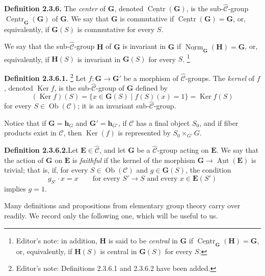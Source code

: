 \medskip
\noindent\textbf{Definition 2.3.6.}
The \emph{center} of \(\mathbf G\), denoted
\(\underline{\operatorname{Centr}}(\mathbf G)\), is the
sub-\(\widehat{\mathscr C}\)-group
\(\underline{\operatorname{Centr}}_{\mathbf G}(\mathbf G)\) of
\(\mathbf G\). We say that \(\mathbf G\) is commutative if
\(\underline{\operatorname{Centr}}(\mathbf G)=\mathbf G\), or,
equivalently, if \(\mathbf G(S)\) is commutative for every \(S\).

We say that the sub-\(\widehat{\mathscr C}\)-group \(\mathbf H\) of
\(\mathbf G\) is invariant in \(\mathbf G\) if
\(\underline{\operatorname{Norm}}_{\mathbf G}(\mathbf H)=\mathbf G\),
or, equivalently, if \(\mathbf H(S)\) is invariant in \(\mathbf G(S)\)
for every \(S\).
\footnote{Editor's note: in addition, \(\mathbf H\) is said to be
\emph{central} in \(\mathbf G\) if
\(\underline{\operatorname{Centr}}_{\mathbf G}(\mathbf H)=\mathbf G\),
or, equivalently, if \(\mathbf H(S)\) is central in \(\mathbf G(S)\)
for every \(S\).}

\medskip
\noindent\textbf{Definition 2.3.6.1.}
\footnote{Editor's note: Definitions 2.3.6.1 and 2.3.6.2 have been
added.}
Let \(f:\mathbf G\to\mathbf G'\) be a morphism of
\(\widehat{\mathscr C}\)-groups. The \emph{kernel} of \(f\), denoted
\(\operatorname{Ker}f\), is the sub-\(\widehat{\mathscr C}\)-group of
\(\mathbf G\) defined by
\[
  (\operatorname{Ker}f)(S)
    =\{x\in\mathbf G(S)\mid f(S)(x)=1\}
    =\operatorname{Ker}f(S)
\]
for every \(S\in\operatorname{Ob}(\mathscr C)\); it is an invariant
sub-\(\widehat{\mathscr C}\)-group.

Notice that if \(\mathbf G=\mathbf h_G\) and
\(\mathbf G'=\mathbf h_{G'}\), if \(\mathscr C\) has a final object
\(S_0\), and if fiber products exist in \(\mathscr C\), then
\(\operatorname{Ker}(f)\) is represented by \(S_0\times_{G'}G\).

\medskip
\noindent\textbf{Definition 2.3.6.2.}\footnotemark[\value{footnote}]
Let \(\mathbf E\in\widehat{\mathscr C}\), and let \(\mathbf G\) be a
\(\widehat{\mathscr C}\)-group acting on \(\mathbf E\). We say that
the action of \(\mathbf G\) on \(\mathbf E\) is \emph{faithful} if the
kernel of the morphism
\(\mathbf G\to\underline{\operatorname{Aut}}(\mathbf E)\) is trivial;
that is, if, for every \(S\in\operatorname{Ob}(\mathscr C)\) and
\(g\in\mathbf G(S)\), the condition
\[
  g_{S'}\cdot x=x
  \qquad
  \text{for every }S'\to S\text{ and every }x\in\mathbf E(S')
\]
implies \(g=1\).

Many definitions and propositions from elementary group theory carry
over readily. We record only the following one, which will be useful to
us.

